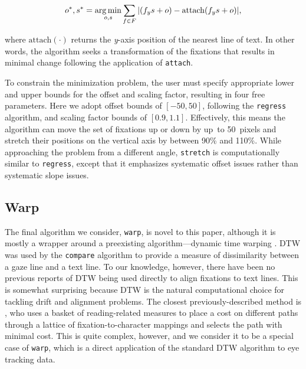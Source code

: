 \documentclass[doc,biblatex]{apa7}
\begin{document}
	\begin{equation}
	o^\ast, s^\ast = \operatornamewithlimits{arg\,min}_{o,s} \sum_{f \in F} | (f_y s + o) - \mathrm{attach}(f_y s + o) |,
	\label{equation1}
	\end{equation}

\noindent
where $\mathrm{attach}(\cdot)$ returns the \textit{y}-axis position of the nearest line of text. In other words, the algorithm seeks a transformation of the fixations that results in minimal change following the application of \texttt{attach}.

To constrain the minimization problem, the user must specify appropriate lower and upper bounds for the offset and scaling factor, resulting in four free parameters. Here we adopt offset bounds of $[-50, 50]$, following the \texttt{regress} algorithm, and scaling factor bounds of $[0.9, 1.1]$. Effectively, this means the algorithm can move the set of fixations up or down by up~to 50~pixels and stretch their positions on the vertical axis by between 90\% and 110\%. While approaching the problem from a different angle, \texttt{stretch} is computationally similar to \texttt{regress}, except that it emphasizes systematic offset issues rather than systematic slope issues.

\subsection{Warp}

The final algorithm we consider, \texttt{warp}, is novel to this paper, although it is mostly a wrapper around a preexisting algorithm---dynamic time warping \parencite[DTW;][]{Vintsyuk:1968,Sakoe:1978}. DTW was used by the \texttt{compare} algorithm to provide a measure of dissimilarity between a gaze line and a text line. To our knowledge, however, there have been no previous reports of DTW being used directly to align fixations to text lines. This is somewhat surprising because DTW is the natural computational choice for tackling drift and alignment problems. The closest previously-described method is \textcite{Carl:2013}, who uses a basket of reading-related measures to place a cost on different paths through a lattice of fixation-to-character mappings and selects the path with minimal cost. This is quite complex, however, and we consider it to be a special case of \texttt{warp}, which is a direct application of the standard DTW algorithm to eye tracking data.
\end{document}
